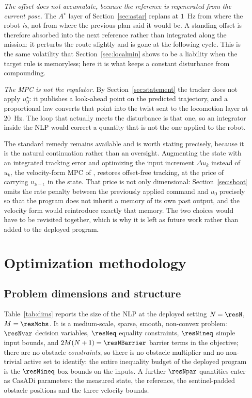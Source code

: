\documentclass[11pt,a4paper]{article}
\newcommand{\astar}{$A^\star$}
\begin{document}
\emph{The offset does not accumulate, because the reference is regenerated from the current pose.} The
\astar{} layer of Section~\ref{sec:astar} replans at $1$~Hz from where the robot \emph{is}, not from where
the previous plan said it would be. A standing offset is therefore absorbed into the next reference rather
than integrated along the mission: it perturbs the route slightly and is gone at the following cycle. This
is the same volatility that Section~\ref{sec:localmin} shows to be a liability when the target rule is
memoryless; here it is what keeps a constant disturbance from compounding.

\emph{The MPC is not the regulator.} By Section~\ref{sec:statement} the tracker does not apply
$u^\star_0$: it publishes a look-ahead point on the predicted trajectory, and a proportional law converts
that point into the twist sent to the locomotion layer at $20$~Hz. The loop that actually meets the
disturbance is that one, so an integrator inside the NLP would correct a quantity that is not the one
applied to the robot.

The standard remedy remains available and is worth stating precisely, because it is the natural
continuation rather than an oversight. Augmenting the state with an integrated tracking error and
optimizing the input increment $\Delta u_k$ instead of $u_k$, the velocity-form MPC of
\cite{rawlings2017mpc,pannocchia2003offsetfree}, restores offset-free tracking, at the price of
carrying $u_{k-1}$ in the state. That price is not only dimensional: Section~\ref{sec:shoot} omits the
rate penalty between the previously applied command and $u_0$ precisely so that the program does not
inherit a memory of its own past output, and the velocity form would reintroduce exactly that memory. The
two choices would have to be revisited together, which is why it is left as future work rather than added
to the deployed program.

\section{Optimization methodology}
\label{sec:optproc}

\subsection{Problem dimensions and structure}
\label{sec:dims}

Table~\ref{tab:dims} reports the size of the NLP at the deployed setting $N=\resN$, $M=\resMobs$. It is a
medium-scale, sparse, smooth, non-convex problem: $\resNvar$ decision variables, $\resNeq$ equality
constraints, $\resNineq$ simple input bounds, and $2M(N+1)=\resNBarrier$ barrier terms in the objective;
there are no obstacle \emph{constraints}, so there is no obstacle multiplier and no non-trivial active set
to identify: the entire inequality budget of the deployed program is the $\resNineq$ box bounds on the
inputs. A further $\resNpar$ quantities enter as CasADi parameters: the measured state, the reference, the
sentinel-padded obstacle positions and the three velocity bounds.
\end{document}
